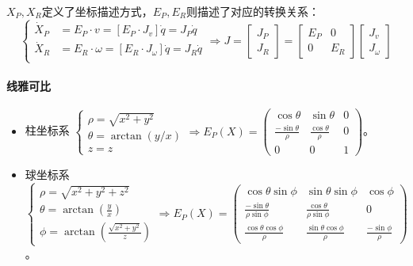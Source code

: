 \documentclass[
12pt, %
a4paper, 
oneside, %
headinclude,footinclude, %
]{scrartcl}
\begin{document}
$ X_P, X_R $定义了坐标描述方式，$ E_P, E_R $则描述了对应的转换关系：
$$
\begin{cases}
\dot{X}_P &= E_P \cdot v = [E_P \cdot J_v] \dot{q} = J_P \dot{q} \\
\dot{X}_R &= E_R \cdot \omega = [E_R \cdot J_\omega] \dot{q} = J_R \dot{q} \\
\end{cases}
\Longrightarrow
J = \begin{bmatrix} J_P \\ J_R \end{bmatrix} = \begin{bmatrix} E_P & 0 \\ 0 & E_R \end{bmatrix} \begin{bmatrix} J_v \\ J_\omega \end{bmatrix}
$$
\paragraph{线雅可比}
\begin{itemize}
\item 柱坐标系
$
\begin{cases}
\rho = \sqrt{x^2 + y^2} \\
\theta = \arctan(y / x) \\
z = z
\end{cases}
\Rightarrow
E_P(X) = \begin{pmatrix} \cos\theta & \sin\theta & 0 \\ \frac{-\sin\theta}{\rho} & \frac{\cos\theta}{\rho} & 0 \\ 0 & 0 & 1 \end{pmatrix}
$。
\item 球坐标系
$
\begin{cases}
\rho = \sqrt{x^2 + y^2 + z^2} \\
\theta = \arctan(\frac{y}{x}) \\
\phi = \arctan(\frac{\sqrt{x^2 + y^2}}{z})
\end{cases}
\Rightarrow
E_P(X) = \begin{pmatrix} \cos\theta \sin\phi & \sin\theta \sin\phi & \cos\phi \\ \frac{-\sin\theta}{\rho \sin\phi} & \frac{\cos\theta}{\rho \sin\phi} & 0 \\ \frac{\cos\theta \cos\phi}{\rho} & \frac{\sin\theta \cos\phi}{\rho} & \frac{-\sin\phi}{\rho} \end{pmatrix}
$。
\end{itemize} 
\end{document}
